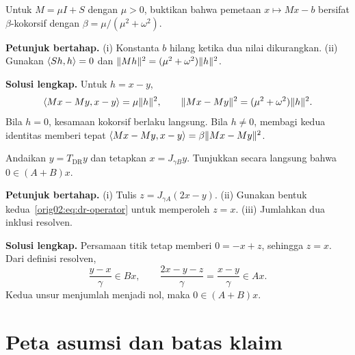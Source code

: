 \begin{exercise}
  \label{orig02:exercise:cocoercivity}
  Untuk $M=\mu I+S$ dengan $\mu>0$, buktikan bahwa pemetaan $x\mapsto Mx-b$
  bersifat $\beta$-kokorsif dengan
  $\beta=\mu/(\mu^2+\omega^2)$.

  \textbf{Petunjuk bertahap.}
  (i) Konstanta $b$ hilang ketika dua nilai dikurangkan.
  (ii) Gunakan $\left\langle Sh , h\right\rangle=0$ dan
  $\|Mh\|^2=(\mu^2+\omega^2)\|h\|^2$.

  \textbf{Solusi lengkap.}
  Untuk $h=x-y$,
  \begin{equation}
    \left\langle Mx-My , x-y\right\rangle=\mu\|h\|^2,
    \qquad
    \|Mx-My\|^2=(\mu^2+\omega^2)\|h\|^2.
  \end{equation}
  Bila $h=0$, kesamaan kokorsif berlaku langsung. Bila $h\neq0$, membagi kedua
  identitas memberi tepat
  $\left\langle Mx-My , x-y\right\rangle=\beta\|Mx-My\|^2$.
\end{exercise}

\begin{exercise}
  \label{orig02:exercise:dr-shadow}
  Andaikan $y=T_{\mathrm{DR}}y$ dan tetapkan $x=J_{\gamma B}y$. Tunjukkan secara
  langsung bahwa $0\in(A+B)x$.

  \textbf{Petunjuk bertahap.}
  (i) Tulis $z=J_{\gamma A}(2x-y)$.
  (ii) Gunakan bentuk kedua~\eqref{orig02:eq:dr-operator} untuk memperoleh
  $z=x$.
  (iii) Jumlahkan dua inklusi resolven.

  \textbf{Solusi lengkap.}
  Persamaan titik tetap memberi $0=-x+z$, sehingga $z=x$. Dari definisi
  resolven,
  \begin{equation}
    \frac{y-x}{\gamma}\in Bx,
    \qquad
    \frac{2x-y-z}{\gamma}
    =\frac{x-y}{\gamma}\in Ax.
  \end{equation}
  Kedua unsur menjumlah menjadi nol, maka $0\in(A+B)x$.
\end{exercise}

\section{Peta asumsi dan batas klaim}
\label{orig02:section:assumption-map}

